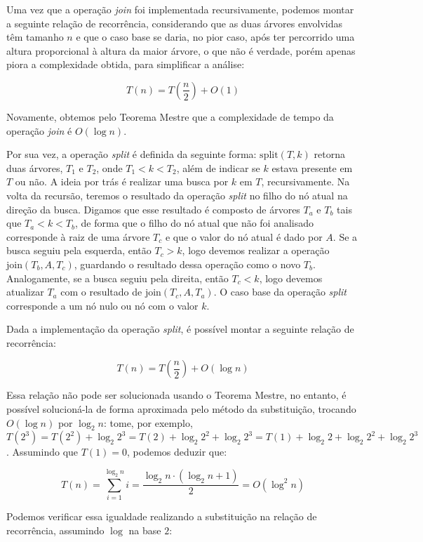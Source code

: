\documentclass[a4paper,12pt]{report}
\begin{document}
Uma vez que a operação \textit{join} foi implementada recursivamente, podemos montar a seguinte 
relação de recorrência, considerando que as duas árvores envolvidas têm tamanho $n$ e que o
caso base se daria, no pior caso, após ter percorrido uma altura proporcional à altura da 
maior árvore, o que não é verdade, porém apenas piora a complexidade obtida, para simplificar 
a análise:

\[
                               T(n) = T\left(\frac{n}{2}\right) + O(1)
\]

Novamente, obtemos pelo Teorema Mestre que a complexidade de tempo da operação \textit{join} é 
$O(\log n)$.

Por sua vez, a operação \textit{split} é definida da seguinte forma: $\textrm{split}(T, k)$ 
retorna duas árvores, $T_1$ e $T_2$, onde $T_1 < k < T_2$, além de indicar se $k$ estava presente 
em $T$ ou não. A ideia por trás é realizar uma busca por $k$ em $T$, recursivamente. Na volta da 
recursão, teremos o resultado da operação \textit{split} no filho do nó atual na direção da busca. 
Digamos que esse resultado é composto de árvores $T_a$ e $T_b$ tais que $T_a < k < T_b$, de forma 
que o filho do nó atual que não foi analisado corresponde à raiz de uma árvore $T_c$ e que o valor 
do nó atual é dado por $A$. Se a busca seguiu pela esquerda, então $T_c > k$, logo devemos realizar 
a operação $\textrm{join}(T_b, A, T_c)$, guardando o resultado dessa operação como o novo $T_b$. 
Analogamente, se a busca seguiu pela direita, então $T_c < k$, logo devemos atualizar $T_a$ com o 
resultado de $\textrm{join}(T_c, A, T_a)$. O caso base da operação \textit{split} corresponde a um 
nó nulo ou nó com o valor $k$.

Dada a implementação da operação \textit{split}, é possível montar a seguinte relação de recorrência:

\[
                             T(n) = T\left(\frac{n}{2}\right) + O(\log n)
\]

Essa relação não pode ser solucionada usando o Teorema Mestre, no entanto, é possível solucioná-la
de forma aproximada pelo método da substituição, trocando $O(\log n)$ por $\log_2 n$: tome, por exemplo,
$T(2^3) = T(2^2) + \log_2 2^3 = T(2) + \log_2 2^2 + \log_2 2^3 = T(1) + \log_2 2 + \log_2 2^2 + \log_2 2^3$.
Assumindo que $T(1) = 0$, podemos deduzir que:

\[
           T(n) = \sum_{i=1}^{\log_2 n} i = \frac{\log_2 n \cdot (\log_2 n + 1)}{2} = O(\log^{2} n)
\]

Podemos verificar essa igualdade realizando a substituição na relação de recorrência, assumindo 
$\log$ na base $2$:
\end{document}
